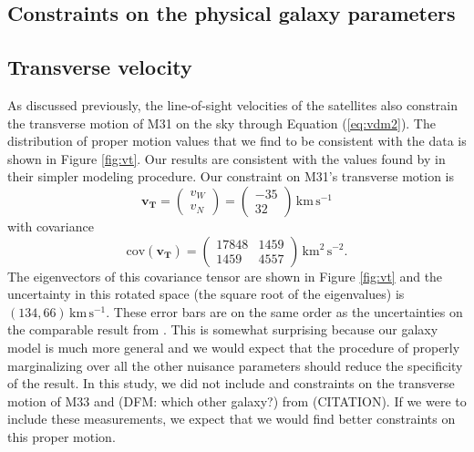 \documentclass[preprint]{aastex}
\newcommand{\fig}[1]{Figure \ref{fig:#1}}
\newcommand{\eq}[1]{Equation (\ref{eq:#1})}
\newcommand{\bvec}[1]{\ensuremath{\boldsymbol{#1}}}
\newcommand{\unit}[1]{\,\mathrm{#1}}
\newcommand{\kms}{\unit{km\,s^{-1}}}
\begin{document}
\subsection{Constraints on the physical galaxy parameters}



\subsection{Transverse velocity}

As discussed previously, the line-of-sight velocities of the satellites also
constrain the transverse motion of M31 on the sky through \eq{vdm2}. The
distribution of proper motion values that we find to be consistent with the
data is shown in \fig{vt}. Our results are consistent with the values found
by \citet{vdm} in their simpler modeling procedure. Our constraint on
M31's transverse motion is
\begin{equation}
    \bvec{v_T} =
    \left ( \begin{array}{c}
        v_W \\ v_N
    \end{array} \right ) =
    \left ( \begin{array}{c}
        -35 \\ 32
    \end{array} \right ) \kms
\end{equation}
with covariance
\begin{equation}
    \mathrm{cov} (\bvec{v_T}) = \left ( \begin{array}{cc}
        17848 & 1459 \\
        1459  & 4557
    \end{array}\right ) \unit{km^2\, s^{-2}}.
\end{equation}
The eigenvectors of this covariance tensor are shown in \fig{vt} and the
uncertainty in this rotated space (the square root of the eigenvalues) is
$(134, 66) \kms$. These error bars are on the same order as the
uncertainties on the comparable result from \citet{vdm}. This is somewhat
surprising because our galaxy model is much more general and we
would expect that the procedure of properly marginalizing over all the
other nuisance parameters should reduce the specificity of the result.
In this study, we did not include and constraints on the transverse motion
of M33 and (DFM: which other galaxy?) from (CITATION). If we were to include
these measurements, we expect that we would find better constraints on this
proper motion.
\end{document}
